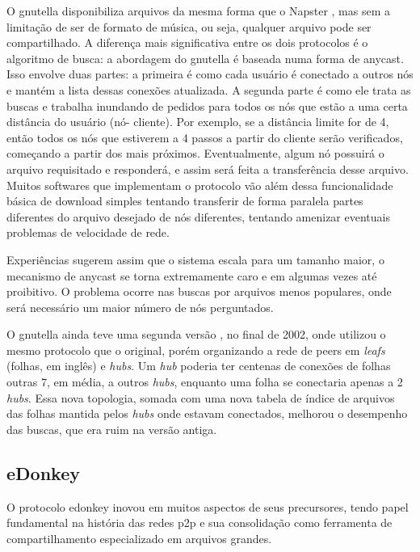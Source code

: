 O \gls*{gnutella} disponibiliza arquivos da mesma forma que o Napster
\cite{book:birman}, mas sem a limitação de ser de formato de música, ou seja, qualquer
arquivo pode ser compartilhado. A diferença mais significativa entre os dois protocolos
é o algoritmo de busca: a abordagem do \gls*{gnutella} é baseada numa forma de
\gls{anycast}. Isso envolve duas partes: a primeira é como cada usuário é conectado a
outros nós e mantém a lista dessas conexões atualizada. A segunda parte é como ele
trata as buscas e trabalha inundando de pedidos para todos os nós que estão a uma certa
distância do usuário (nó- cliente). Por exemplo, se a distância limite for de 4, então
todos os nós que estiverem a 4 passos a partir do cliente serão verificados, começando
a partir dos mais próximos. Eventualmente, algum nó possuirá o arquivo requisitado e
responderá, e assim será feita a transferência desse arquivo. Muitos softwares que
implementam o protocolo vão além dessa funcionalidade básica de download simples
tentando transferir de forma paralela partes diferentes do arquivo desejado de nós
diferentes, tentando amenizar eventuais problemas de velocidade de rede.

Experiências sugerem assim que o sistema escala para um tamanho maior, o mecanismo de
\gls*{anycast} se torna extremamente caro e em algumas vezes até proibitivo. O problema
ocorre nas buscas por arquivos menos populares, onde será necessário um maior número de
nós perguntados.

O \gls*{gnutella} ainda teve uma segunda versão \cite{wiki:gnutella2}, no final de 2002,
onde utilizou o mesmo protocolo que o original, porém organizando a rede de
\glspl*{peer} em \emph{leafs} (folhas, em inglês) e \emph{hubs}. Um \emph{hub} poderia
ter centenas de conexões de folhas outras 7, em média, a outros \emph{hubs}, enquanto
uma folha se conectaria apenas a 2 \emph{hubs}. Essa nova topologia, somada com uma
nova tabela de índice de arquivos das folhas mantida pelos \emph{hubs} onde estavam
conectados, melhorou o desempenho das buscas, que era ruim na versão antiga.

\subsection{eDonkey}

O protocolo \gls{edonkey} inovou em muitos aspectos de seus precursores, tendo papel
fundamental na história das redes \gls*{p2p} e sua consolidação como ferramenta de
compartilhamento especializado em arquivos grandes.

